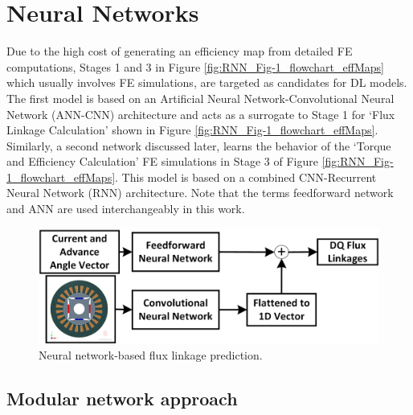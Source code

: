 \section{Neural Networks} \label{RNN:4_Neural_networks}
Due to the high cost of generating an efficiency map from detailed FE computations, Stages 1 and 3 in Figure \ref{fig:RNN_Fig-1_flowchart_effMaps} which usually involves FE simulations, are targeted as candidates for DL models. The first model is based on an Artificial Neural Network-Convolutional Neural Network (ANN-CNN) architecture and acts as a surrogate to Stage 1 for ‘Flux Linkage Calculation’ shown in Figure \ref{fig:RNN_Fig-1_flowchart_effMaps}. Similarly, a second network discussed later, learns the behavior of the ‘Torque and Efficiency Calculation’ FE simulations in Stage 3 of Figure \ref{fig:RNN_Fig-1_flowchart_effMaps}. This model is based on a combined CNN-Recurrent Neural Network (RNN) architecture. Note that the terms feedforward network and ANN are used interchangeably in this work.

\begin{figure}[h!]
    \centering
    \includegraphics[width=\textwidth]{Figures/Chp_RNN/Fig 3_mod.png}
    \caption{Neural network-based flux linkage prediction.}
    \label{fig:RNN_Fig-3_neuralnet_fluxLinkage}
\end{figure}

\subsection{Modular network approach}\label{RNN:4.1_Modular_nw_approach_theory}

